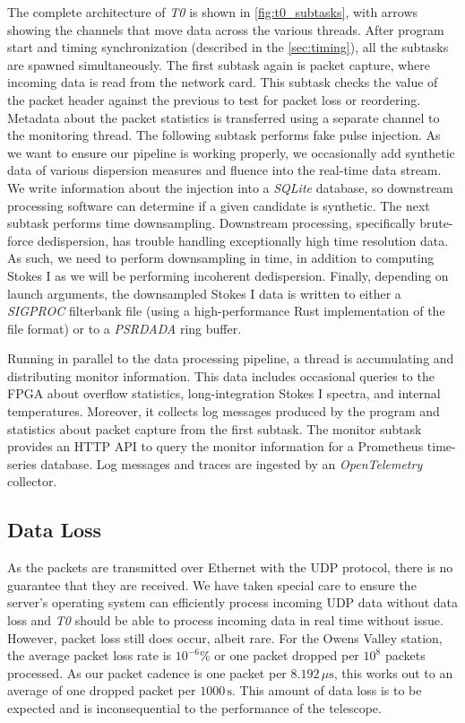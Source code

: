 The complete architecture of \textit{T0} is shown in \autoref{fig:t0_subtasks}, with arrows showing the channels that move data across the various threads.
After program start and timing synchronization (described in the \autoref{sec:timing}), all the subtasks are spawned simultaneously.
The first subtask again is packet capture, where incoming data is read from the network card.
This subtask checks the value of the packet header against the previous to test for packet loss or reordering.
Metadata about the packet statistics is transferred using a separate channel to the monitoring thread.
The following subtask performs fake pulse injection.
As we want to ensure our pipeline is working properly, we occasionally add synthetic data of various dispersion measures and fluence into the real-time data stream.
We write information about the injection into a \textit{SQLite} database, so downstream processing software can determine if a given candidate is synthetic.
The next subtask performs time downsampling.
Downstream processing, specifically brute-force dedispersion, has trouble handling exceptionally high time resolution data.
As such, we need to perform downsampling in time, in addition to computing Stokes I as we will be performing incoherent dedispersion.
Finally, depending on launch arguments, the downsampled Stokes I data is written to either a \textit{SIGPROC} filterbank file (using a high-performance Rust implementation of the file format) or to a \textit{PSRDADA} ring buffer.

Running in parallel to the data processing pipeline, a thread is accumulating and distributing monitor information.
This data includes occasional queries to the FPGA about overflow statistics, long-integration Stokes I spectra, and internal temperatures.
Moreover, it collects log messages produced by the program and statistics about packet capture from the first subtask.
The monitor subtask provides an HTTP API to query the monitor information for a Prometheus time-series database.
Log messages and traces are ingested by an \textit{OpenTelemetry} collector.

\subsection{Data Loss}
As the packets are transmitted over Ethernet with the UDP protocol, there is no guarantee that they are received.
We have taken special care to ensure the server's operating system can efficiently process incoming UDP data without data loss and \textit{T0} should be able to process incoming data in real time without issue.
However, packet loss still does occur, albeit rare.
For the Owens Valley station, the average packet loss rate is $10^{-6}$\% or one packet dropped per $10^8$ packets processed.
As our packet cadence is one packet per $8.192\,\mu\text{s}$, this works out to an average of one dropped packet per $1000\,\text{s}$.
This amount of data loss is to be expected and is inconsequential to the performance of the telescope.

